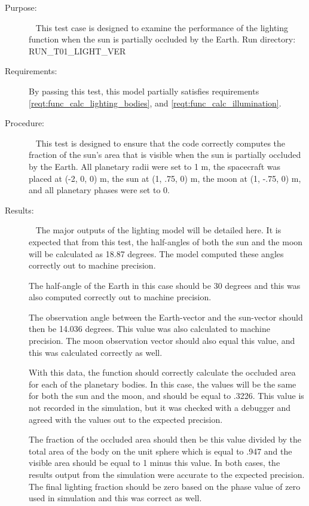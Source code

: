 \label{test:plan_disc}
\begin{description}
\item[Purpose:] \ \newline
This test case is designed to examine the performance of the lighting
function when the sun is partially occluded by the Earth.
\newline
Run directory: RUN\_T01\_LIGHT\_VER \newline
\item[Requirements:] %
By passing this test, this model partially satisfies requirements
\mbox{\ref{reqt:func_calc_lighting_bodies}}, and
\mbox{\ref{reqt:func_calc_illumination}}.

\item[Procedure:]\ \newline
This test is designed to ensure that the code correctly computes the fraction
of the sun's area that is visible when the sun is partially occluded by the
Earth.  All planetary radii were set to 1 m, the spacecraft was
placed at (-2, 0, 0) m, the sun at (1, .75, 0) m, the moon at (1, -.75, 0) m,
and all planetary phases were set to 0.
\item[Results:]\ \newline
The major outputs of the lighting model will be detailed here.  It is expected
that from this test, the half-angles of both the sun and the moon will be
calculated as 18.87 degrees.  The model computed these angles correctly out to
machine precision.

The half-angle of the Earth in this case should be 30 degrees and this was
also computed correctly out to machine precision.

The observation angle between the Earth-vector and the sun-vector should then
be 14.036 degrees.  This value was also calculated to machine precision.  The
moon observation vector should also equal this value, and this was calculated
correctly as well.

With this data, the function should correctly calculate the occluded area for
each of the planetary bodies.  In this case, the values will be the same for
both the sun and the moon, and should be equal to .3226.
This value is not recorded in the
simulation, but it was checked with a debugger and agreed with the values
out to the expected precision.

The fraction of the occluded area should then be this value divided by the
total area of the body on the unit sphere which is equal to .947 and the
visible area should be equal to 1 minus this value.  In both cases, the
results output from the simulation were accurate to the expected precision.
The final lighting fraction should be zero based on the phase value of zero
used in simulation and this was correct as well.

\end{description}

